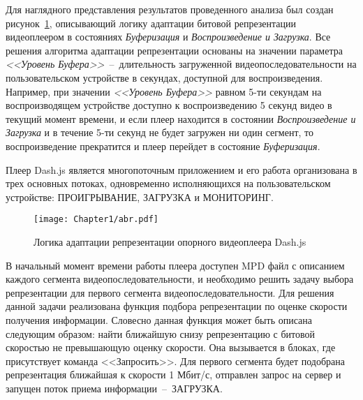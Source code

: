 Для наглядного представления результатов проведенного анализа был создан рисунок~\ref{fig:abr}, описывающий логику адаптации битовой репрезентации видеоплеером в состояниях \textit{Буферизация} и \textit{Воспроизведение и Загрузка}. Все решения алгоритма адаптации репрезентации основаны на значении параметра \textit{<<Уровень Буфера>>}~--~длительность загруженной видеопоследовательности на пользовательском устройстве в секундах, доступной для воспроизведения. Например, при значении \textit{<<Уровень Буфера>>} равном 5-ти секундам на воспроизводящем устройстве доступно к воспроизведению 5 секунд видео в текущий момент времени, и если плеер находится в состоянии \textit{Воспроизведение и Загрузка} и в течение 5-ти секунд не будет загружен ни один сегмент, то воспроизведение прекратится и плеер перейдет в состояние \textit{Буферизация}.

Плеер Dash.js является многопоточным приложением и его работа организована в трех основных потоках, одновременно исполняющихся на пользовательском устройстве: ПРОИГРЫВАНИЕ, ЗАГРУЗКА и МОНИТОРИНГ.

\begin{landscape}
\begin{figure}[h]
\begin{center}
\texttt{[image: Chapter1/abr.pdf]}
\caption{Логика адаптации репрезентации опорного видеоплеера Dash.js}
\label{fig:abr}
\end{center}
\end{figure}
\end{landscape}

В начальный момент времени работы плеера доступен MPD файл с описанием каждого сегмента видеопоследовательности, и необходимо решить задачу выбора репрезентации для первого сегмента видеопоследовательности. Для решения данной задачи реализована функция подбора репрезентации по оценке скорости получения информации. Словесно данная функция может быть описана следующим образом: найти ближайшую снизу репрезентацию с битовой скоростью не превышающую оценку скорости. Она вызывается в блоках, где присутствует команда <<Запросить>>. Для первого сегмента будет подобрана репрезентация ближайшая к скорости 1 Мбит/с, отправлен запрос на сервер и запущен поток приема информации~--~ЗАГРУЗКА.

